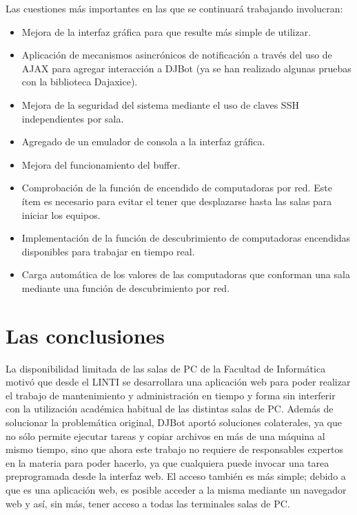 \documentclass[runningheads,a4paper,titlepage]{llncs}
\begin{document}
Las cuestiones m\'as importantes en las que se continuará trabajando involucran:

\begin{itemize}
\item{Mejora de la interfaz gr\'afica para que resulte m\'as simple de
utilizar.}
\item{Aplicación de  mecanismos asincrónicos de notificación a través del uso de
AJAX
para agregar interacción a DJBot (ya se han realizado algunas pruebas con la
biblioteca Dajaxice).}
\item{Mejora de la seguridad del sistema mediante el uso de claves SSH
independientes por sala.}
\item{Agregado de  un emulador de consola a la interfaz gr\'afica.}
\item{Mejora del funcionamiento del buffer.}
\item{Comprobaci\'on de la funci\'on de encendido de computadoras por red. Este
ítem es necesario para evitar el tener que desplazarse hasta las salas para
iniciar los equipos.}
\item{Implementaci\'on de la funci\'on de descubrimiento de computadoras
encendidas disponibles para trabajar en tiempo real.}
\item{Carga autom\'atica de los valores de las computadoras que conforman una
sala mediante una funci\'on de descubrimiento por red.}
\end{itemize}

\section{Las conclusiones}
\noindent La disponibilidad limitada de las salas de PC de la Facultad de Inform\'atica
motivó que desde el LINTI se desarrollara una aplicaci\'on web para poder
realizar el trabajo de mantenimiento y administración en tiempo y forma sin
interferir con la utilización académica habitual de las distintas salas de PC.
Además de solucionar
la problemática original, DJBot aportó soluciones colaterales, ya que no sólo
permite ejecutar
tareas y copiar archivos en m\'as de una m\'aquina al mismo tiempo, sino que
ahora este trabajo no requiere de responsables expertos en la materia para poder
hacerlo, 
ya que cualquiera puede invocar una tarea preprogramada desde la interfaz web.
El acceso también es más simple; debido a que es una aplicación web, es posible
acceder a la
misma mediante un navegador web y así, sin más, tener acceso a todas las terminales salas de
PC.
\end{document}
